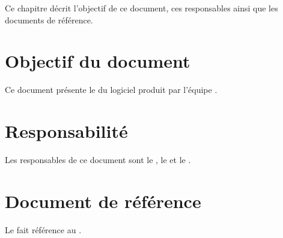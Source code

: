 
	Ce chapitre décrit l'objectif de ce document, ces responsables ainsi que les documents de référence.

\section{Objectif du document}
	Ce document présente le \JTI{} du logiciel produit par l'équipe \nomEquipe{}.
	
\section{Responsabilité}
	Les responsables de ce document sont le \CP, le \RQ{} et le \RD.
	
\section{Document de référence}
	Le \JTI{} fait référence au \PTI.
